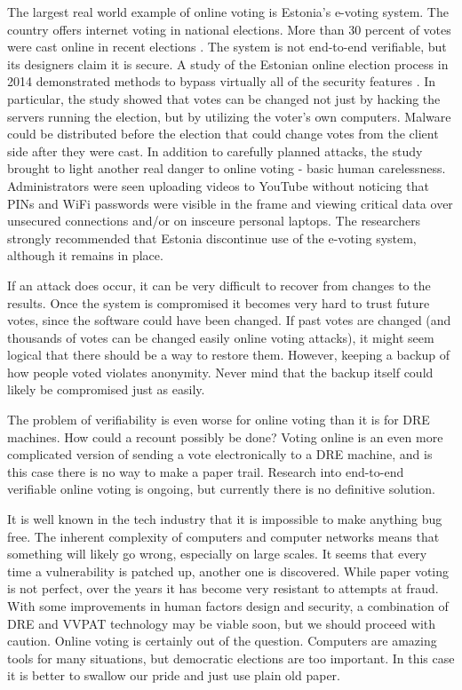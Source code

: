 \documentclass[12pt, titlepage]{article}
\begin{document}
The largest real world example of online voting is Estonia's e-voting system. The country offers internet voting in national elections. More than 30 percent of votes were cast online in recent elections \cite{hao2016real}. The system is not end-to-end verifiable, but its designers claim it is secure. A study of the Estonian online election process in 2014 demonstrated methods to bypass virtually all of the security features \cite{springall2014security}. In particular, the study showed that votes can be changed not just by hacking the servers running the election, but by utilizing the voter's own computers. Malware could be distributed before the election that could change votes from the client side after they were cast. In addition to carefully planned attacks, the study brought to light another real danger to online voting - basic human carelessness. Administrators were seen uploading videos to YouTube without noticing that PINs and WiFi passwords were visible in the frame and viewing critical data over unsecured connections and/or on insceure personal laptops. The researchers strongly recommended that Estonia discontinue use of the e-voting system, although it remains in place.

If an attack does occur, it can be very difficult to recover from changes to the results. Once the system is compromised it becomes very hard to trust future votes, since the software could have been changed. If past votes are changed (and thousands of votes can be changed easily online voting attacks), it might seem logical that there should be a way to restore them. However, keeping a backup of how people voted violates anonymity. Never mind that the backup itself could likely be compromised just as easily.

The problem of verifiability is even worse for online voting than it is for DRE machines. How could a recount possibly be done? Voting online is an even more complicated version of sending a vote electronically to a DRE machine, and is this case there is no way to make a paper trail. Research into end-to-end verifiable online voting is ongoing, but currently there is no definitive solution.

It is well known in the tech industry that it is impossible to make anything bug free. The inherent complexity of computers and computer networks means that something will likely go wrong, especially on large scales. It seems that every time a vulnerability is patched up, another one is discovered. While paper voting is not perfect, over the years it has become very resistant to attempts at fraud. With some improvements in human factors design and security, a combination of DRE and VVPAT technology may be viable soon, but we should proceed with caution. Online voting is certainly out of the question. Computers are amazing tools for many situations, but democratic elections are too important. In this case it is better to swallow our pride and just use plain old paper.

\newpage
\printbibliography
\end{document}
